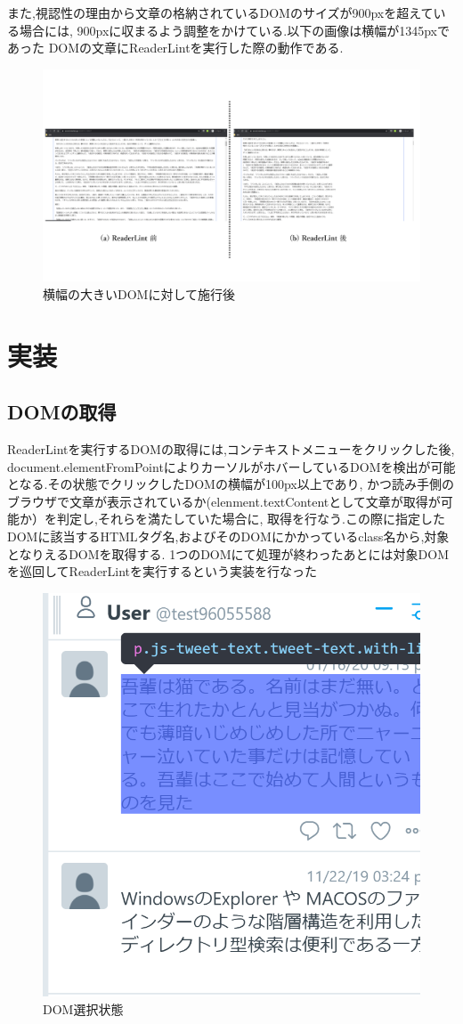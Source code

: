 また,視認性の理由から文章の格納されているDOMのサイズが900pxを超えている場合には,
900pxに収まるよう調整をかけている.以下の画像は横幅が1345pxであった
DOMの文章にReaderLintを実行した際の動作である.\footnotemark[2]


\begin{figure}[H]
    \centering
    \label{fig:image12}
    \includegraphics[width=0.8\columnwidth]{image/03/img8.png}
	\caption[幅の大きいDOMに対して施行後]{横幅の大きいDOMに対して施行後}
\end{figure}

\section{実装}

\subsection{DOMの取得}
ReaderLintを実行するDOMの取得には,コンテキストメニューをクリックした後,
document.elementFromPointによりカーソルがホバーしているDOMを検出が可能となる.その状態でクリックしたDOMの横幅が100px以上であり,
かつ読み手側のブラウザで文章が表示されているか(elenment.textContentとして文章が取得が可能か）を判定し,それらを満たしていた場合に,
取得を行なう.この際に指定したDOMに該当するHTMLタグ名,およびそのDOMにかかっているclass名から,対象となりえるDOMを取得する.
1つのDOMにて処理が終わったあとには対象DOMを巡回してReaderLintを実行するという実装を行なった

\begin{figure}[H]
    \centering
    \label{fig:image10}
    \includegraphics[width=0.5\columnwidth]{image/03/img1.png}
    \caption[DOM選択状態] {DOM選択状態}
\end{figure}

